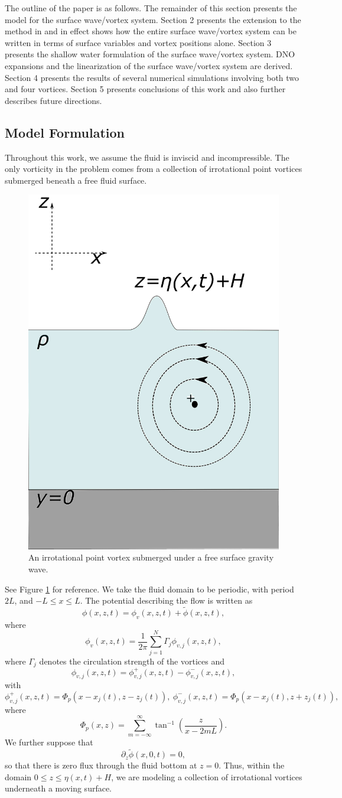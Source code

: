 \documentclass[a4paper,11pt]{article}
\newcommand{\p}{\partial}
\begin{document}
The outline of the paper is as follows.  The remainder of this section presents the model for the surface wave/vortex system.  Section 2 presents the extension to the method in \cite{afm} and in effect shows how the entire surface wave/vortex system can be written in terms of surface variables and vortex positions alone.  Section 3 presents the shallow water formulation of the surface wave/vortex system.  DNO expansions and the linearization of the surface wave/vortex system are derived.  Section 4 presents the results of several numerical simulations involving both two and four vortices.  Section 5 presents conclusions of this work and also further describes future directions.  
  
\subsection{Model Formulation}
Throughout this work, we assume the fluid is inviscid and incompressible.  The only vorticity in the problem comes from a collection of irrotational point vortices submerged beneath a free fluid surface.  
\begin{figure}
\centering
\includegraphics[width=.25\textwidth]{surface_vortex}
\caption{An irrotational point vortex submerged under a free surface gravity wave.}
\label{fig:vortex}
\end{figure}
See Figure \ref{fig:vortex} for reference.  We take the fluid domain to be periodic, with period $2L$, and $-L\leq x \leq L$.  The potential describing the flow is written as 
\[
\phi(x,z,t) = \phi_{v}(x,z,t) + \tilde{\phi}(x,z,t), 
\]
where
\[
\phi_{v}(x,z,t) = \frac{1}{2\pi}\sum_{j=1}^{N}\Gamma_{j} \phi_{v,j}(x,z,t),
\]
where $\Gamma_{j}$ denotes the circulation strength of the vortices and
\[
\phi_{v,j}(x,z,t) = \phi_{v,j}^{+}(x,z,t) - \phi_{v,j}^{-}(x,z,t), 
\]
with
\[
\phi_{v,j}^{+}(x,z,t) = \Phi_{p}(x-x_{j}(t),z-z_{j}(t)), ~ \phi_{v,j}^{-}(x,z,t) = \Phi_{p}(x-x_{j}(t),z+z_{j}(t)), 
\]
where
\[
\Phi_{p}(x,z) = \sum_{m=-\infty}^{\infty} \tan^{-1}\left(\frac{z}{x-2m L} \right).
\]
We further suppose that 
\[
\p_{z}\tilde{\phi}(x,0,t) = 0, 
\]
so that there is zero flux through the fluid bottom at $z=0$.  Thus, within the domain $0\leq z \leq \eta(x,t)+H$, we are modeling a collection of irrotational vortices underneath a moving surface. 
\end{document}
